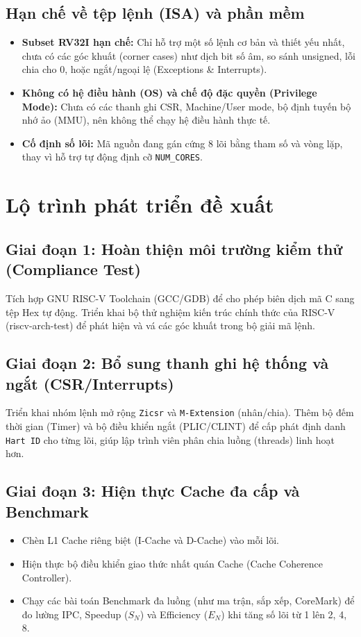 \subsection{Hạn chế về tệp lệnh (ISA) và phần mềm}
\begin{itemize}
    \item \textbf{Subset RV32I hạn chế:} Chỉ hỗ trợ một số lệnh cơ bản và thiết yếu nhất, chưa có các góc khuất (corner cases) như dịch bit số âm, so sánh unsigned, lỗi chia cho 0, hoặc ngắt/ngoại lệ (Exceptions \& Interrupts).
    \item \textbf{Không có hệ điều hành (OS) và chế độ đặc quyền (Privilege Mode):} Chưa có các thanh ghi CSR, Machine/User mode, bộ định tuyến bộ nhớ ảo (MMU), nên không thể chạy hệ điều hành thực tế.
    \item \textbf{Cố định số lõi:} Mã nguồn đang gán cứng 8 lõi bằng tham số và vòng lặp, thay vì hỗ trợ tự động định cỡ \texttt{NUM\_CORES}.
\end{itemize}

\section{Lộ trình phát triển đề xuất}

\subsection{Giai đoạn 1: Hoàn thiện môi trường kiểm thử (Compliance Test)}
Tích hợp GNU RISC-V Toolchain (GCC/GDB) để cho phép biên dịch mã C sang tệp Hex tự động. Triển khai bộ thử nghiệm kiến trúc chính thức của RISC-V (riscv-arch-test) để phát hiện và vá các góc khuất trong bộ giải mã lệnh.

\subsection{Giai đoạn 2: Bổ sung thanh ghi hệ thống và ngắt (CSR/Interrupts)}
Triển khai nhóm lệnh mở rộng \texttt{Zicsr} và \texttt{M-Extension} (nhân/chia). Thêm bộ đếm thời gian (Timer) và bộ điều khiển ngắt (PLIC/CLINT) để cấp phát định danh \texttt{Hart ID} cho từng lõi, giúp lập trình viên phân chia luồng (threads) linh hoạt hơn.

\subsection{Giai đoạn 3: Hiện thực Cache đa cấp và Benchmark}
\begin{itemize}
    \item Chèn L1 Cache riêng biệt (I-Cache và D-Cache) vào mỗi lõi.
    \item Hiện thực bộ điều khiển giao thức nhất quán Cache (Cache Coherence Controller).
    \item Chạy các bài toán Benchmark đa luồng (như ma trận, sắp xếp, CoreMark) để đo lường IPC, Speedup ($S_N$) và Efficiency ($E_N$) khi tăng số lõi từ 1 lên 2, 4, 8.
\end{itemize}

